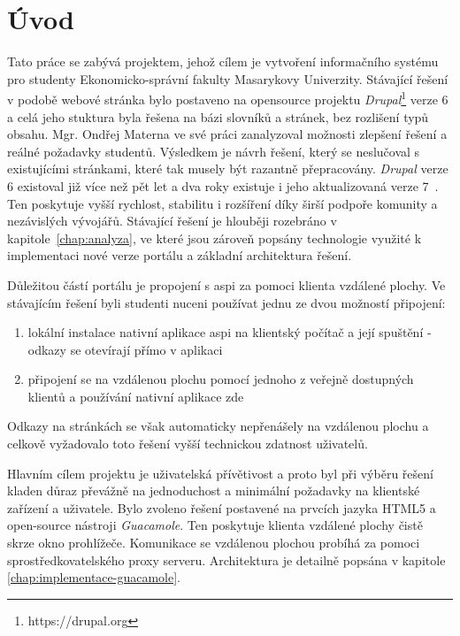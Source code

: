 \chapter{Úvod}
Tato práce se zabývá projektem, jehož cílem je vytvoření informačního systému pro studenty Ekonomicko-správní fakulty Masarykovy Univerzity. Stávající řešení v podobě webové stránka bylo postaveno na \gls{opensource} projektu \emph{Drupal}\footnote{https://drupal.org} verze 6 a celá jeho stuktura byla řešena na bázi slovníků a stránek, bez rozlišení typů obsahu. Mgr. Ondřej Materna ve své práci zanalyzoval možnosti zlepšení řešení a reálné požadavky studentů. Výsledkem je návrh řešení, který se neslučoval s existujícími stránkami, které tak musely být razantně přepracovány. \emph{Drupal} verze 6 existoval již více než pět let a dva roky existuje i jeho aktualizovaná verze 7~\cite{website:wiki:drupal}. Ten poskytuje vyšší rychlost, stabilitu i rozšíření díky širší podpoře komunity a nezávislých vývojářů. Stávající řešení je hlouběji rozebráno v kapitole~\ref{chap:analyza}, ve které jsou zároveň popsány technologie využité k implementaci nové verze portálu a základní architektura řešení.

Důležitou částí portálu je propojení s \gls{aspi} za pomoci klienta vzdálené plochy. Ve stávajícím řešení byli studenti nuceni používat jednu ze dvou možností připojení:

\begin{enumerate}
  \item lokální instalace nativní aplikace \gls{aspi} na klientský počítač a  její spuštění - odkazy se otevírají přímo v aplikaci
  \item připojení se na vzdálenou plochu pomocí jednoho z veřejně dostupných klientů a používání nativní aplikace zde
\end{enumerate}

Odkazy na stránkách se však automaticky nepřenášely na vzdálenou plochu a celkově vyžadovalo toto řešení vyšší technickou zdatnost uživatelů.

Hlavním cílem projektu je uživatelská přívětivost a proto byl při výběru řešení kladen důraz převážně na jednoduchost a minimální požadavky na klientské zařízení a uživatele. Bylo zvoleno řešení postavené na prvcích jazyka HTML5 a open-source nástroji \emph{Guacamole}. Ten poskytuje klienta vzdálené plochy čistě skrze okno prohlížeče. Komunikace se vzdálenou plochou probíhá za pomoci sprostředkovatelského proxy serveru. Architektura je detailně popsána v kapitole \ref{chap:implementace-guacamole}.

